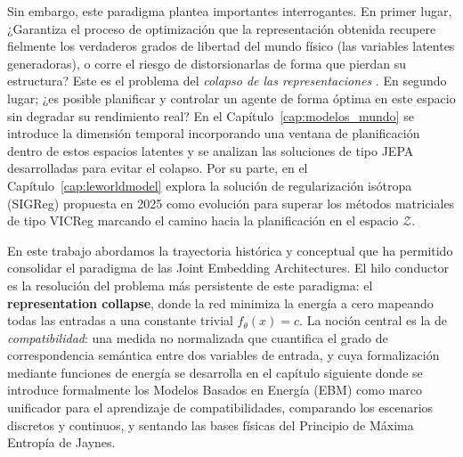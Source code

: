 Sin embargo, este paradigma plantea importantes interrogantes. En primer lugar, ¿Garantiza el proceso de optimización que la representación obtenida recupere fielmente los verdaderos grados de libertad del mundo físico (las variables latentes generadoras), o corre el riesgo de distorsionarlas de forma que pierdan su estructura? Este es el problema del \emph{colapso de las representaciones} \cite{jing2022understanding}. En segundo lugar; ¿es posible planificar y controlar un agente de forma óptima en este espacio sin degradar su rendimiento real? En el Capítulo~\ref{cap:modelos_mundo} se introduce la dimensión temporal incorporando una ventana de planificación dentro de estos espacios latentes y se analizan las soluciones de tipo JEPA desarrolladas para evitar el colapso. Por su parte, en el Capítulo~\ref{cap:leworldmodel} explora la solución de regularización isótropa (SIGReg) propuesta en 2025 \cite{balestriero2025lejepa} como evolución para superar los métodos matriciales de tipo VICReg marcando el camino hacia la planificación en el espacio $\mathcal{Z}$.

En este trabajo abordamos la trayectoria histórica y conceptual que ha permitido consolidar el paradigma de las Joint Embedding Architectures. El hilo conductor es la resolución del problema más persistente de este paradigma: el \textbf{representation collapse}, donde la red minimiza la energía a cero mapeando todas las entradas a una constante trivial $f_{\theta}(x) = c$. La noción central es la de \emph{compatibilidad}: una medida no normalizada que cuantifica el grado de correspondencia semántica entre dos variables de entrada, y cuya formalización mediante funciones de energía se desarrolla en el capítulo siguiente donde se introduce formalmente los Modelos Basados en Energía (EBM) como marco unificador para el aprendizaje de compatibilidades, comparando los escenarios discretos y continuos, y sentando las bases físicas del Principio de Máxima Entropía de Jaynes.